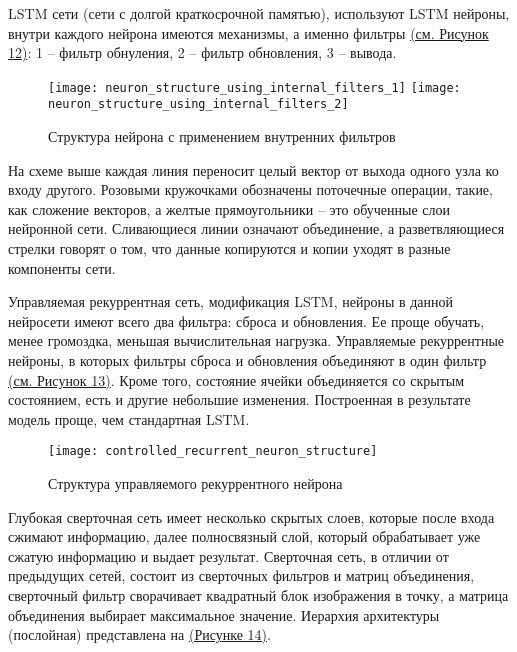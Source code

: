     LSTM сети (сети с долгой краткосрочной памятью), используют LSTM нейроны, внутри каждого нейрона имеются механизмы, а именно фильтры \hyperref[fig:neuron_structure_using_internal_filters]{(см. Рисунок 12)}: 1 – фильтр обнуления, 2 – фильтр обновления, 3 – вывода.

    \begin{figure}[ht]
        \centering
        \texttt{[image: neuron\_structure\_using\_internal\_filters\_1]}
        \texttt{[image: neuron\_structure\_using\_internal\_filters\_2]}
        \caption{Структура нейрона с применением внутренних фильтров}
        \label{fig:neuron_structure_using_internal_filters}
    \end{figure}    

    На схеме выше каждая линия переносит целый вектор от выхода одного узла ко входу другого. Розовыми кружочками обозначены поточечные операции, такие, как сложение векторов, а желтые прямоугольники – это обученные слои нейронной сети. Сливающиеся линии означают объединение, а разветвляющиеся стрелки говорят о том, что данные копируются и копии уходят в разные компоненты сети.
    
    Управляемая рекуррентная сеть, модификация LSTM, нейроны в данной нейросети имеют всего два фильтра: сброса и обновления. Ее проще обучать, менее громоздка, меньшая вычислительная нагрузка. Управляемые рекуррентные нейроны, в которых фильтры сброса и обновления объединяют в один фильтр \hyperref[fig:controlled_recurrent_neuron_structure]{(см. Рисунок 13)}. Кроме того, состояние ячейки объединяется со скрытым состоянием, есть и другие небольшие изменения. Построенная в результате модель проще, чем стандартная LSTM.

    \begin{figure}[ht]
        \centering
        \texttt{[image: controlled\_recurrent\_neuron\_structure]}
        \caption{Структура управляемого рекуррентного нейрона}
        \label{fig:controlled_recurrent_neuron_structure}
    \end{figure}

    Глубокая сверточная сеть имеет несколько скрытых слоев, которые после входа сжимают информацию, далее полносвязный слой, который обрабатывает уже сжатую информацию и выдает результат. Сверточная сеть, в отличии от предыдущих сетей, состоит из сверточных фильтров и матриц объединения, сверточный фильтр сворачивает квадратный блок изображения в точку, а матрица объединения выбирает максимальное значение. Иерархия архитектуры (послойная) представлена на \hyperref[fig:deep_convolutional_neural_network_layered_structure]{(Рисунке 14)}.
    
